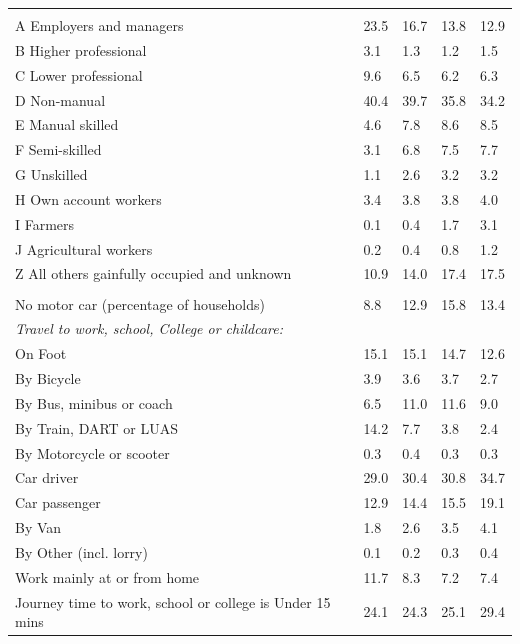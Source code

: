 \documentclass{article}
\begin{document}
\begin{table}[h]
\begin{tabular}{KTTTT}
\hline
    \\ 
    \hline
A Employers and managers & 23.5& 16.7& 13.8& 12.9\\
B Higher professional & 3.1& 1.3& 1.2& 1.5\\
C Lower professional & 9.6& 6.5& 6.2& 6.3\\
D Non-manual & 40.4& 39.7& 35.8& 34.2\\
E Manual skilled & 4.6& 7.8& 8.6& 8.5\\
F Semi-skilled & 3.1& 6.8& 7.5& 7.7\\
G Unskilled & 1.1& 2.6& 3.2& 3.2\\
H Own account workers & 3.4& 3.8& 3.8& 4.0\\
I Farmers & 0.1& 0.4& 1.7& 3.1\\
J Agricultural workers & 0.2& 0.4& 0.8& 1.2\\
Z All others gainfully occupied and unknown & 10.9& 14.0& 17.4& 17.5\\
\hline
{}\hline
    \\ 
    \hline
No motor car (percentage of households) &  8.8& 12.9& 15.8& 
13.4\\
    \hline 
\emph{Travel to work, school, College or childcare:} & & & \\
\quad On Foot & 15.1& 15.1& 14.7& 12.6\\ 
\quad By Bicycle & 3.9& 3.6& 3.7& 2.7\\ 
\quad By Bus, minibus or coach &  6.5& 11.0& 11.6&  9.0\\
\quad By Train, DART or LUAS & 14.2&  7.7&  3.8&  2.4\\
\quad By Motorcycle or scooter & 0.3& 0.4& 0.3& 0.3\\
\quad Car driver & 29.0 & 30.4& 30.8& 34.7\\
\quad Car passenger & 12.9& 14.4& 15.5& 19.1\\
\quad By Van & 1.8& 2.6& 3.5& 4.1\\
\quad By Other (incl. lorry) & 0.1& 0.2& 0.3& 0.4\\
    \hline
Work mainly at or from home & 11.7&  8.3&  7.2&  7.4\\
Journey time to work, school or college is Under 15 mins & 24.1& 24.3& 25.1& 29.4\\

\end{tabular}
\end{table}
\end{document}
